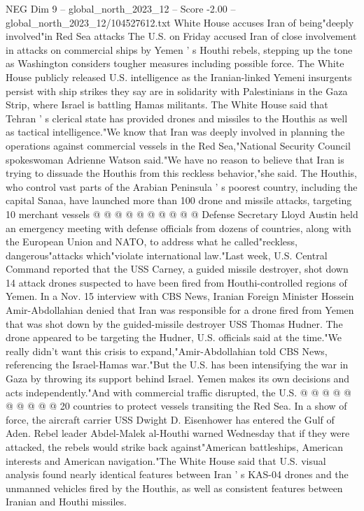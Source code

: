 \begin{textsample}{NEG Dim 9 – global\_north\_2023\_12 – Score -2.00 – global\_north\_2023\_12/104527612.txt}  \label{ex:f9_neg_290}
White House accuses Iran of being"deeply involved"in Red Sea attacks The U.S. on Friday accused Iran of close involvement in attacks on commercial ships by Yemen ' s Houthi rebels, stepping up the tone as Washington considers tougher measures including possible force.
The White House publicly released U.S. intelligence as the Iranian-linked Yemeni insurgents persist with ship strikes they say are in solidarity with Palestinians in the Gaza Strip, where Israel is battling Hamas militants.
The White House said that Tehran ' s clerical state has provided drones and missiles to the Houthis as well as tactical intelligence."We know that Iran was deeply involved in planning the operations against commercial vessels in the Red Sea,"National Security Council spokeswoman Adrienne Watson said."We have no reason to believe that Iran is trying to dissuade the Houthis from this reckless behavior,"she said.
The Houthis, who control vast parts of the Arabian Peninsula ' s poorest country, including the capital Sanaa, have launched more than 100 drone and missile attacks, targeting 10 merchant vessels @ @ @ @ @ @ @ @ @ @ Defense Secretary Lloyd Austin held an emergency meeting with defense officials from dozens of countries, along with the European Union and NATO, to address what he called"reckless, dangerous"attacks which"violate international law."Last week, U.S.
Central Command reported that the USS Carney, a guided missile destroyer, shot down 14 attack drones suspected to have been fired from Houthi-controlled regions of Yemen.
In a Nov. 15 interview with CBS News, Iranian Foreign Minister Hossein Amir-Abdollahian denied that Iran was responsible for a drone fired from Yemen that was shot down by the guided-missile destroyer USS Thomas Hudner.
The drone appeared to be targeting the Hudner, U.S. officials said at the time."We really didn't want this crisis to expand,"Amir-Abdollahian told CBS News, referencing the Israel-Hamas war."But the U.S. has been intensifying the war in Gaza by throwing its support behind Israel.
Yemen makes its own decisions and acts independently."And with commercial traffic disrupted, the U.S. @ @ @ @ @ @ @ @ @ @ 20 countries to protect vessels transiting the Red Sea.
In a show of force, the aircraft carrier USS Dwight D.
Eisenhower has entered the Gulf of Aden.
Rebel leader Abdel-Malek al-Houthi warned Wednesday that if they were attacked, the rebels would strike back against"American battleships, American interests and American navigation."The White House said that U.S. visual analysis found nearly identical features between Iran ' s KAS-04 drones and the unmanned vehicles fired by the Houthis, as well as consistent features between Iranian and Houthi missiles.

\end{textsample}
